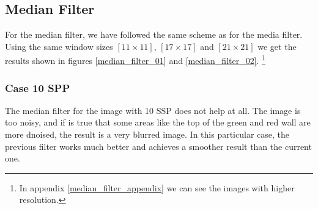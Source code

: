 \documentclass[titlepage,12pt]{report}
\begin{document}
\subsection{Median Filter}

For the median filter, we have followed the same scheme as for the media filter. Using the same window sizes $[11 \times 11]$, $[17 \times 17]$ and $[21 \times 21]$ we get the results shown in figures \ref{median_filter_01} and \ref{median_filter_02}. \footnote{In appendix \ref{median_filter_appendix} we can see the images with higher resolution.}

\subsubsection{Case 10 SPP}

The median filter for the image with 10 SSP does not help at all. The image is too noisy, and if is true that some areas like the top of the green and red wall are more dnoised, the result is a very blurred image. In this particular case, the previous filter works much better and achieves a smoother result than the current one.
\end{document}
